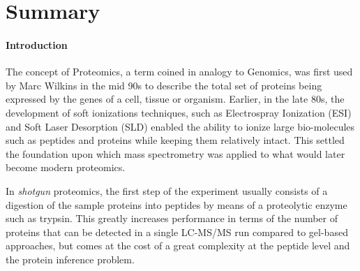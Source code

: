 %
%
%
%
%

\chapter{Summary}




\subsubsection*{Introduction}
The concept of Proteomics, a term coined in analogy to Genomics,
was first used by Marc Wilkins in the mid 90s to describe
the total set of proteins being expressed by the genes of a cell,
tissue or organism.
Earlier, in the late 80s, the development of soft ionizations techniques, 
such as Electrospray Ionization (ESI) and Soft Laser Desorption (SLD)
enabled the ability to ionize large bio-molecules such as peptides and proteins while
keeping them relatively intact. This settled the foundation upon which
mass spectrometry was applied to what would later become modern proteomics.

In \textit{shotgun} proteomics, the first step of the experiment usually
consists of a digestion of the sample proteins into peptides by means of
a proteolytic enzyme such as trypsin. This greatly increases performance
in terms of the number of proteins that can be detected in a single 
LC-MS/MS run compared to gel-based approaches, but comes at the cost 
of a great complexity at the peptide level and the protein inference problem. 

